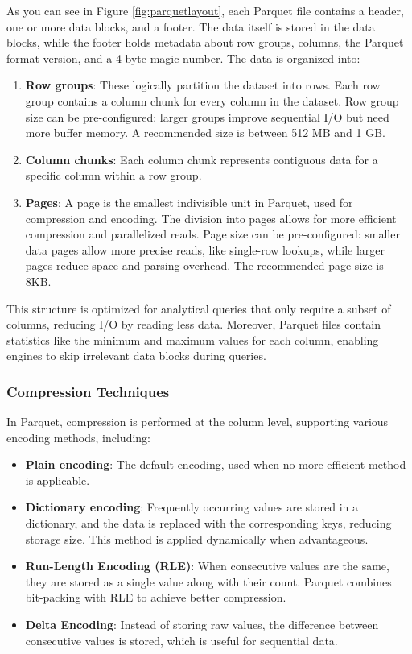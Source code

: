 As you can see in Figure \ref{fig:parquetlayout}, each Parquet file contains a header, one or more data blocks, and a footer. The data itself is stored in the data blocks, while the footer holds metadata about row groups, columns, the Parquet format version, and a 4-byte magic number. The data is organized into:
\begin{enumerate}
    \item \textbf{Row groups}: These logically partition the dataset into rows. Each row group contains a column chunk for every column in the dataset. Row group size can be pre-configured: larger groups improve sequential \ac{I/O} but need more buffer memory. A recommended size is between 512 MB and 1 GB.
    \item \textbf{Column chunks}: Each column chunk represents contiguous data for a specific column within a row group.
    \item \textbf{Pages}: A page is the smallest indivisible unit in Parquet, used for compression and encoding. The division into pages allows for more efficient compression and parallelized reads. Page size can be pre-configured:
    smaller data pages allow more precise reads, like single-row lookups, while larger pages reduce space and parsing overhead. The recommended page size is 8KB.
\end{enumerate}

This structure is optimized for analytical queries that only require a subset of columns, reducing \ac{I/O} by reading less data. Moreover, Parquet files contain statistics like the minimum and maximum values for each column, enabling engines to skip irrelevant data blocks during queries.

\subsubsection{Compression Techniques}

In Parquet, compression is performed at the column level, supporting various encoding methods, including:
\begin{itemize}
    \item \textbf{Plain encoding}: The default encoding, used when no more efficient method is applicable.
    \item \textbf{Dictionary encoding}: Frequently occurring values are stored in a dictionary, and the data is replaced with the corresponding keys, reducing storage size. This method is applied dynamically when advantageous.
    \item \textbf{Run-Length Encoding (RLE)}: When consecutive values are the same, they are stored as a single value along with their count. Parquet combines bit-packing with RLE to achieve better compression.
    \item \textbf{Delta Encoding}: Instead of storing raw values, the difference between consecutive values is stored, which is useful for sequential data.
\end{itemize}

